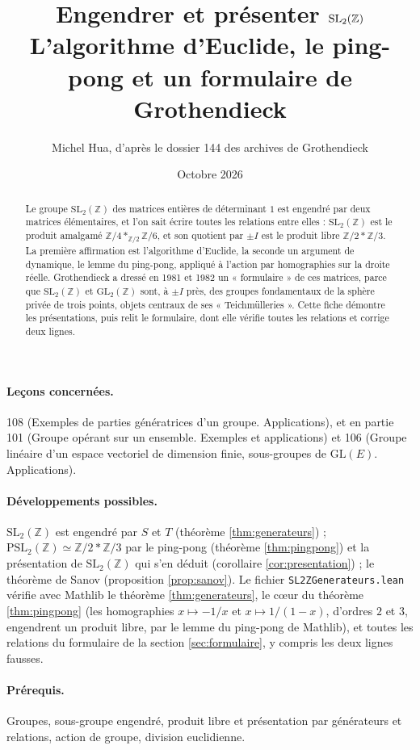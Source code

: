 \documentclass[11pt,a4paper]{article}
\title{Engendrer et présenter \texorpdfstring{$\SL_2(\Z)$}{SL2(Z)}\\[2pt]
\large L'algorithme d'Euclide, le ping-pong et un formulaire de Grothendieck}
\author{Michel Hua, d'après le dossier 144 des archives de Grothendieck}
\date{Octobre 2026}
\theoremstyle{plain}
\theoremstyle{definition}
\theoremstyle{remark}
\newcommand{\Z}{\mathbb{Z}}
\newcommand{\SL}{\mathrm{SL}}
\newcommand{\GL}{\mathrm{GL}}
\newcommand{\PSL}{\mathrm{PSL}}
\begin{document}
\maketitle

\begin{abstract}
Le groupe $\SL_2(\Z)$ des matrices entières de déterminant $1$ est engendré par deux matrices élémentaires, et l'on sait écrire toutes les relations entre elles : $\SL_2(\Z)$ est le produit amalgamé $\Z/4*_{\Z/2}\Z/6$, et son quotient par $\pm I$ est le produit libre $\Z/2*\Z/3$. La première affirmation est l'algorithme d'Euclide, la seconde un argument de dynamique, le lemme du ping-pong, appliqué à l'action par homographies sur la droite réelle. Grothendieck a dressé en 1981 et 1982 un « formulaire » de ces matrices, parce que $\SL_2(\Z)$ et $\GL_2(\Z)$ sont, à $\pm I$ près, des groupes fondamentaux de la sphère privée de trois points, objets centraux de ses « Teichmülleries ». Cette fiche démontre les présentations, puis relit le formulaire, dont elle vérifie toutes les relations et corrige deux lignes.
\end{abstract}

\paragraph{Leçons concernées.} 108 (Exemples de parties génératrices d'un groupe. Applications), et en partie 101 (Groupe opérant sur un ensemble. Exemples et applications) et 106 (Groupe linéaire d'un espace vectoriel de dimension finie, sous-groupes de $\GL(E)$. Applications).

\paragraph{Développements possibles.} $\SL_2(\Z)$ est engendré par $S$ et $T$ (théorème \ref{thm:generateurs}) ; $\PSL_2(\Z)\simeq\Z/2*\Z/3$ par le ping-pong (théorème \ref{thm:pingpong}) et la présentation de $\SL_2(\Z)$ qui s'en déduit (corollaire \ref{cor:presentation}) ; le théorème de Sanov (proposition \ref{prop:sanov}). Le fichier \texttt{SL2ZGenerateurs.lean} vérifie avec Mathlib le théorème \ref{thm:generateurs}, le cœur du théorème \ref{thm:pingpong} (les homographies $x\mapsto-1/x$ et $x\mapsto1/(1-x)$, d'ordres $2$ et $3$, engendrent un produit libre, par le lemme du ping-pong de Mathlib), et toutes les relations du formulaire de la section \ref{sec:formulaire}, y compris les deux lignes fausses.

\paragraph{Prérequis.} Groupes, sous-groupe engendré, produit libre et présentation par générateurs et relations, action de groupe, division euclidienne.
\end{document}
